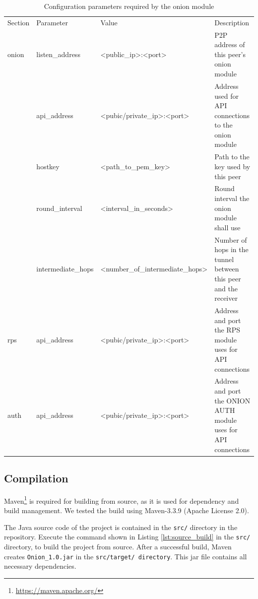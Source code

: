 \documentclass[paper=letter, fontsize=12pt]{article}
\begin{document}
\begin{table}[H]
    \centering
    \caption{Configuration parameters required by the onion module}
    \label{tab:configuration_params}
    \begin{tabular}{l|l|l|p{5cm}}
        Section & Parameter             & Value                             & Description   \\ \Xhline{3\arrayrulewidth}
        onion   & listen\_address       & <public\_ip>:<port>               & P2P address of this peer's onion module \\ \cline{2-4}
                & api\_address          & <pubic/private\_ip>:<port>        & Address used for API connections to the onion module \\ \cline{2-4}
                & hostkey               & <path\_to\_pem\_key>              & Path to the key used by this peer \\ \cline{2-4}
                & round\_interval       & <interval\_in\_seconds>           & Round interval the onion module shall use \\ \cline{2-4}
                & intermediate\_hops    & <number\_of\_intermediate\_hops>  & Number of hops in the tunnel between this peer and the receiver \\ \Xhline{1.5\arrayrulewidth}
        rps     & api\_address          & <pubic/private\_ip>:<port>        & Address and port the RPS module uses for API connections \\ \Xhline{1.5\arrayrulewidth}
        auth    & api\_address          & <pubic/private\_ip>:<port>        & Address and port the ONION AUTH module uses for API connections
    \end{tabular}
\end{table}


\subsection{Compilation} \label{sec:compilation}
Maven\footnote{\url{https://maven.apache.org/}} is required for building from source, as it is used for dependency and build management.
We tested the build using Maven-3.3.9 (Apache License 2.0).

The Java source code of the project is contained in the \texttt{src/} directory in the repository.
Execute the command shown in Listing \ref{lst:source_build} in the \texttt{src/} directory, to build the project from source.
After a successful build, Maven creates \texttt{Onion\_1.0.jar} in the \texttt{src/target/ directory}.
This jar file contains all necessary dependencies.
\end{document}
